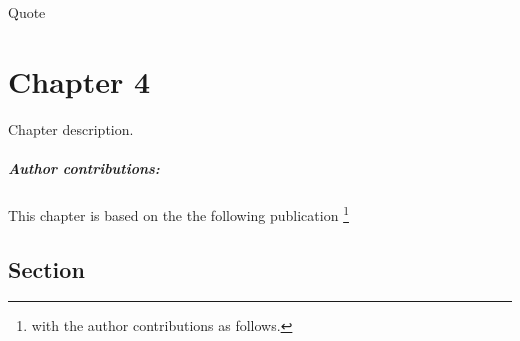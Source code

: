 \begin{savequote}[8cm]
    Quote
\end{savequote}
    
\chapter{\label{ch4}Chapter 4} 

Chapter description.
\small\paragraph{Author contributions:} This chapter is based on the the following publication \footnote{with the author contributions as follows.} \par\vspace{1em}

\minitoc

\clearpage

\section{Section}

    \blindtext